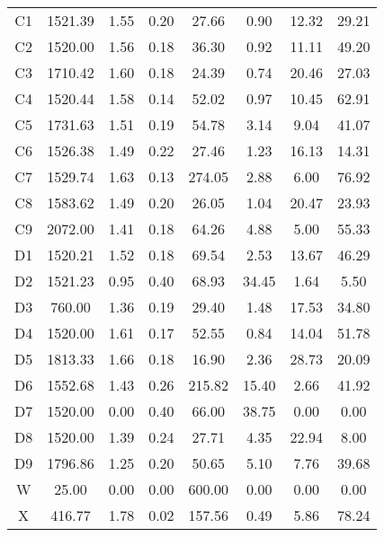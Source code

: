 \begin{table}[h!]
\begin{tabular}{c c c c c c c c}
			C1	 & 	1521.39	 & 	1.55	 & 	0.20	 & 	27.66	 & 	0.90	 & 	12.32	 & 	29.21 \\
			C2	 & 	1520.00	 & 	1.56	 & 	0.18	 & 	36.30	 & 	0.92	 & 	11.11	 & 	49.20 \\
			C3	 & 	1710.42	 & 	1.60	 & 	0.18	 & 	24.39	 & 	0.74	 & 	20.46	 & 	27.03 \\
			C4	 & 	1520.44	 & 	1.58	 & 	0.14	 & 	52.02	 & 	0.97	 & 	10.45	 & 	62.91 \\
			C5	 & 	1731.63	 & 	1.51	 & 	0.19	 & 	54.78	 & 	3.14	 & 	9.04	 & 	41.07 \\
			C6	 & 	1526.38	 & 	1.49	 & 	0.22	 & 	27.46	 & 	1.23	 & 	16.13	 & 	14.31 \\
			C7	 & 	1529.74	 & 	1.63	 & 	0.13	 & 	274.05	 & 	2.88	 & 	6.00	 & 	76.92 \\
			C8	 & 	1583.62	 & 	1.49	 & 	0.20	 & 	26.05	 & 	1.04	 & 	20.47	 & 	23.93 \\
			C9	 & 	2072.00	 & 	1.41	 & 	0.18	 & 	64.26	 & 	4.88	 & 	5.00	 & 	55.33 \\
			D1	 & 	1520.21	 & 	1.52	 & 	0.18	 & 	69.54	 & 	2.53	 & 	13.67	 & 	46.29 \\
			D2	 & 	1521.23	 & 	0.95	 & 	0.40	 & 	68.93	 & 	34.45	 & 	1.64	 & 	5.50 \\
			D3	 & 	760.00	 & 	1.36	 & 	0.19	 & 	29.40	 & 	1.48	 & 	17.53	 & 	34.80 \\
			D4	 & 	1520.00	 & 	1.61	 & 	0.17	 & 	52.55	 & 	0.84	 & 	14.04	 & 	51.78 \\
			D5	 & 	1813.33	 & 	1.66	 & 	0.18	 & 	16.90	 & 	2.36	 & 	28.73	 & 	20.09 \\
			D6	 & 	1552.68	 & 	1.43	 & 	0.26	 & 	215.82	 & 	15.40	 & 	2.66	 & 	41.92 \\
			D7	 & 	1520.00	 & 	0.00	 & 	0.40	 & 	66.00	 & 	38.75	 & 	0.00	 & 	0.00 \\
			D8	 & 	1520.00	 & 	1.39	 & 	0.24	 & 	27.71	 & 	4.35	 & 	22.94	 & 	8.00 \\
			D9	 & 	1796.86	 & 	1.25	 & 	0.20	 & 	50.65	 & 	5.10	 & 	7.76	 & 	39.68 \\
			W	 & 	25.00	 & 	0.00	 & 	0.00	 & 	600.00	 & 	0.00	 & 	0.00	 & 	0.00 \\
			X	 & 	416.77	 & 	1.78	 & 	0.02	 & 	157.56	 & 	0.49	 & 	5.86	 & 	78.24 \\
			\hline		
		\end{tabular}
		
		\label{table:soil_prop}
	\end{table}	
	